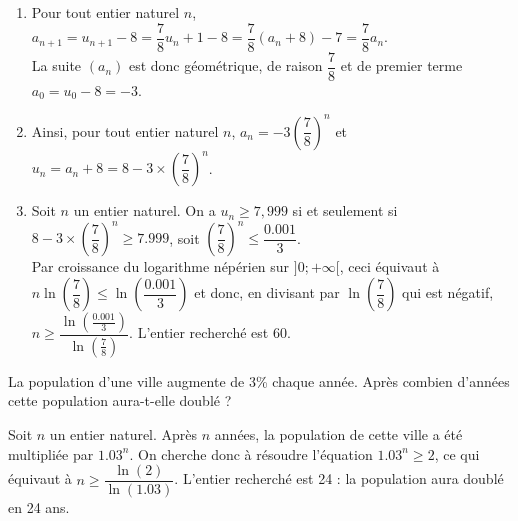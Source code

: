 \documentclass[11pt,fleqn, openany]{book} %
\begin{document}
\begin{solution}\hspace{0pt}

\begin{enumerate}\item Pour tout entier naturel \(n\), $a_{n+1}=u_{n+1}-8=\dfrac{7}{8}u_n+1-8=\dfrac{7}{8}(a_n+8)-7=\dfrac{7}{8}a_n$.\\
La suite \((a_n)\) est donc géométrique, de raison \(\dfrac{7}{8}\) et de premier terme \(a_0=u_0-8=-3\).

\item Ainsi, pour tout entier naturel \(n\), \(a_n=-3 \left(\dfrac{7}{8}\right)^n\) et \(u_n=a_n+8=8-3\times\left(\dfrac{7}{8}\right)^n\).

\item  Soit \(n\) un entier naturel. On a \(u_n \geqslant 7,999\) si et seulement si \(8-3\times\left(\dfrac{7}{8}\right)^n\geqslant 7.999\), soit \(\left(\dfrac{7}{8}\right)^n \leqslant \dfrac{0.001}{3}\). \\ Par croissance du logarithme népérien sur \(]0;+\infty[\), ceci équivaut à \(n\ln\left(\dfrac{7}{8}\right) \leqslant \ln\left(\dfrac{0.001}{3}\right)\) et donc, en divisant par \(\ln\left(\dfrac{7}{8}\right)\) qui est négatif,  \(n \geqslant \dfrac{\ln\left(\frac{0.001}{3}\right)}{\ln\left(\frac{7}{8}\right)}\). L'entier recherché est 60.\end{enumerate}
\end{solution}



\begin{exercise}La population d'une ville augmente de 3\% chaque année. Après combien d'années cette population aura-t-elle doublé ?\end{exercise}

\begin{solution}

Soit \(n\) un entier naturel. Après \(n\) années, la population de cette ville a été multipliée par \(1.03^n\). On cherche donc à résoudre l'équation \(1.03^n \geqslant 2\), ce qui équivaut à \(n\geqslant \dfrac{\ln(2)}{\ln(1.03)}\). L'entier recherché est 24 : la population aura doublé en 24 ans.
\end{solution}
\end{document}
